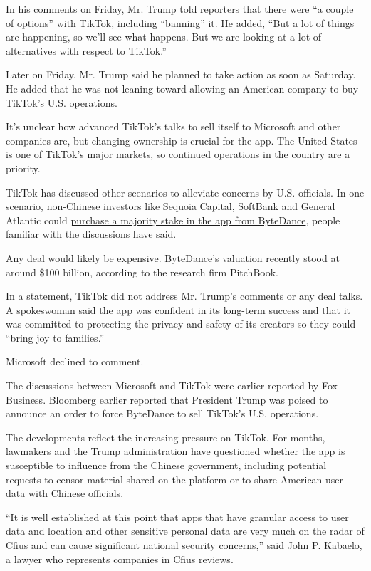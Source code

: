 In his comments on Friday, Mr. Trump told reporters that there were ``a
couple of options'' with TikTok, including ``banning'' it. He added,
``But a lot of things are happening, so we'll see what happens. But we
are looking at a lot of alternatives with respect to TikTok.''

Later on Friday, Mr. Trump said he planned to take action as soon as
Saturday. He added that he was not leaning toward allowing an American
company to buy TikTok's U.S. operations.

It's unclear how advanced TikTok's talks to sell itself to Microsoft and
other companies are, but changing ownership is crucial for the app. The
United States is one of TikTok's major markets, so continued operations
in the country are a priority.

TikTok has discussed other scenarios to alleviate concerns by U.S.
officials. In one scenario, non-Chinese investors like Sequoia Capital,
SoftBank and General Atlantic could
\href{https://www.nytimes3xbfgragh.onion/2020/07/23/business/dealbook/tiktok-bytedance-investors-trump.html}{purchase
a majority stake in the app from ByteDance}, people familiar with the
discussions have said.

Any deal would likely be expensive. ByteDance's valuation recently stood
at around \$100 billion, according to the research firm PitchBook.

In a statement, TikTok did not address Mr. Trump's comments or any deal
talks. A spokeswoman said the app was confident in its long-term success
and that it was committed to protecting the privacy and safety of its
creators so they could ``bring joy to families.''

Microsoft declined to comment.

The discussions between Microsoft and TikTok were earlier reported by
Fox Business. Bloomberg earlier reported that President Trump was poised
to announce an order to force ByteDance to sell TikTok's U.S.
operations.

The developments reflect the increasing pressure on TikTok. For months,
lawmakers and the Trump administration have questioned whether the app
is susceptible to influence from the Chinese government, including
potential requests to censor material shared on the platform or to share
American user data with Chinese officials.

``It is well established at this point that apps that have granular
access to user data and location and other sensitive personal data are
very much on the radar of Cfius and can cause significant national
security concerns,'' said John P. Kabaelo, a lawyer who represents
companies in Cfius reviews.


